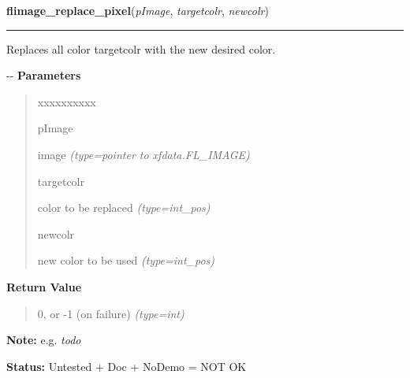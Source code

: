\hspace{.8\funcindent}\begin{boxedminipage}{\funcwidth}

    \raggedright \textbf{flimage\_replace\_pixel}(\textit{pImage}, \textit{targetcolr}, \textit{newcolr})

    \vspace{-1.5ex}

    \rule{\textwidth}{0.5\fboxrule}
\setlength{\parskip}{2ex}

Replaces all color targetcolr with the new desired color.

-{}-
\setlength{\parskip}{1ex}
      \textbf{Parameters}
      \vspace{-1ex}

      \begin{quote}
        \begin{Ventry}{xxxxxxxxxx}

          \item[pImage]


image
            {\it (type=pointer to xfdata.FL\_IMAGE)}

          \item[targetcolr]


color to be replaced
            {\it (type=int\_pos)}

          \item[newcolr]


new color to be used
            {\it (type=int\_pos)}

        \end{Ventry}

      \end{quote}

      \textbf{Return Value}
    \vspace{-1ex}

      \begin{quote}

0, or -1 (on failure)
      {\it (type=int)}

      \end{quote}

\textbf{Note:} 
e.g. \emph{todo}


\textbf{Status:} 
Untested + Doc + NoDemo = NOT OK


    \end{boxedminipage}

    \label{xformslib:flflimage:flimage_transform_pixels}

